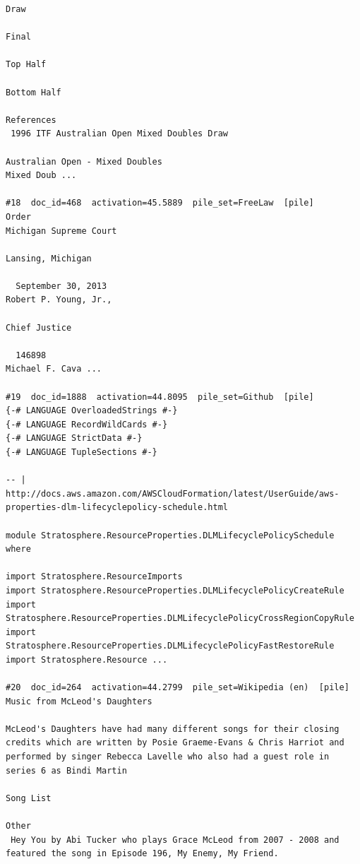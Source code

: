 \begin{verbatim}
Draw

Final

Top Half

Bottom Half

References
 1996 ITF Australian Open Mixed Doubles Draw

Australian Open - Mixed Doubles
Mixed Doub ...

#18  doc_id=468  activation=45.5889  pile_set=FreeLaw  [pile]
Order                                                                                       Michigan Supreme Court
                                                                                                  Lansing, Michigan

  September 30, 2013                                                                                  Robert P. Young, Jr.,
                                                                                                                Chief Justice

  146898                                                                                              Michael F. Cava ...

#19  doc_id=1888  activation=44.8095  pile_set=Github  [pile]
{-# LANGUAGE OverloadedStrings #-}
{-# LANGUAGE RecordWildCards #-}
{-# LANGUAGE StrictData #-}
{-# LANGUAGE TupleSections #-}

-- | http://docs.aws.amazon.com/AWSCloudFormation/latest/UserGuide/aws-properties-dlm-lifecyclepolicy-schedule.html

module Stratosphere.ResourceProperties.DLMLifecyclePolicySchedule where

import Stratosphere.ResourceImports
import Stratosphere.ResourceProperties.DLMLifecyclePolicyCreateRule
import Stratosphere.ResourceProperties.DLMLifecyclePolicyCrossRegionCopyRule
import Stratosphere.ResourceProperties.DLMLifecyclePolicyFastRestoreRule
import Stratosphere.Resource ...

#20  doc_id=264  activation=44.2799  pile_set=Wikipedia (en)  [pile]
Music from McLeod's Daughters

McLeod's Daughters have had many different songs for their closing credits which are written by Posie Graeme-Evans & Chris Harriot and performed by singer Rebecca Lavelle who also had a guest role in series 6 as Bindi Martin

Song List

Other
 Hey You by Abi Tucker who plays Grace McLeod from 2007 - 2008 and featured the song in Episode 196, My Enemy, My Friend.


\end{verbatim}
